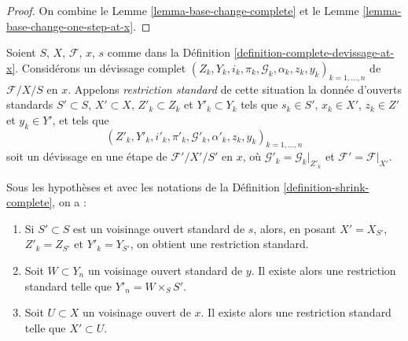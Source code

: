 \begin{proof}
On combine
le Lemme \ref{lemma-base-change-complete}
et
le Lemme \ref{lemma-base-change-one-step-at-x}.
\end{proof}

\begin{definition}
\label{definition-shrink-complete}
Soient $S$, $X$, $\mathcal{F}$, $x$, $s$ comme dans la
Définition \ref{definition-complete-devissage-at-x}.
Considérons un d\'evissage complet
$(Z_k, Y_k, i_k, \pi_k, \mathcal{G}_k, \alpha_k, z_k, y_k)_{k = 1, \ldots, n}$
de $\mathcal{F}/X/S$ en $x$. Appelons
{\it restriction standard} de cette situation la donnée
d'ouverts standards $S' \subset S$, $X' \subset X$,
$Z'_k \subset Z_k$ et $Y'_k \subset Y_k$ tels que $s_k \in S'$,
$x_k \in X'$, $z_k \in Z'$ et $y_k \in Y'$, et tels que
$$
(Z'_k, Y'_k, i'_k, \pi'_k,
\mathcal{G}'_k, \alpha'_k, z_k, y_k)_{k = 1, \ldots, n}
$$
soit un d\'evissage en une étape de $\mathcal{F}'/X'/S'$ en $x$, où
$\mathcal{G}'_k = \mathcal{G}_k|_{Z'_k}$ et
$\mathcal{F}' = \mathcal{F}|_{X'}$.
\end{definition}

\begin{lemma}
\label{lemma-shrink-complete}
Sous les hypothèses et avec les notations de la
Définition \ref{definition-shrink-complete},
on a :
\begin{enumerate}
\item
\label{item-shrink-base-complete}
Si $S' \subset S$ est un voisinage ouvert standard de $s$, alors,
en posant $X' = X_{S'}$, $Z'_k = Z_{S'}$ et $Y'_k = Y_{S'}$, on obtient une
restriction standard.
\item
\label{item-shrink-on-Y-complete}
Soit $W \subset Y_n$ un voisinage ouvert standard de $y$.
Il existe alors une restriction standard telle que $Y'_n = W \times_S S'$.
\item
\label{item-shrink-on-X-complete}
Soit $U \subset X$ un voisinage ouvert de $x$.
Il existe alors une restriction standard telle que $X' \subset U$.
\end{enumerate}
\end{lemma}

